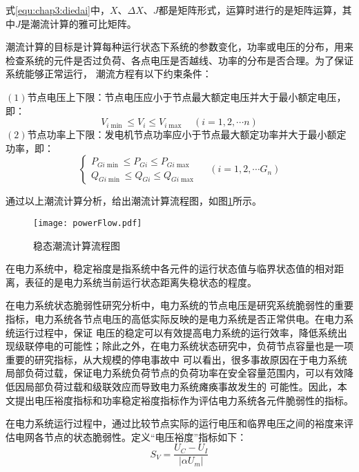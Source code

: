 式\ref{equ:chap3:diedai}中，$X$、$\Delta X$、$J$都是矩阵形式，运算时进行的是矩阵运算，其中$J$是潮流计算的雅可比矩阵。

潮流计算的目标是计算每种运行状态下系统的参数变化，功率或电压的分布，用来检查系统的元件是否过负荷、各点电压是否越线、功率的分布是否合理。为了保证系统能够正常运行，
潮流方程有以下约束条件：

$(1)$节点电压上下限：节点电压应小于节点最大额定电压并大于最小额定电压，即：
\begin{equation}
  V_{i \min } \leq V_{i} \leq V_{i \max } \quad(i=1,2, \cdots n)
  \end{equation}
$(2)$节点功率上下限：发电机节点功率应小于节点最大额定功率并大于最小额定功率，即：
\begin{equation}
\left\{\begin{array}{l}{P_{G i \min } \leq P_{G i} \leq P_{G i \max }} \\ {Q_{G i \min } \leq Q_{G i} \leq Q_{G i \max }}\end{array} \quad\left(i=1,2, \cdots G_{n}\right)\right.
\end{equation}

通过以上潮流计算分析，给出潮流计算流程图，如图\ref{fig:powerFlow}所示。
\begin{figure}[H] %
  \centering
  \texttt{[image: powerFlow.pdf]}
  \caption{稳态潮流计算流程图}
  \label{fig:powerFlow}
\end{figure}


在电力系统中，稳定裕度是指系统中各元件的运行状态值与临界状态值的相对距离，表征的是电力系统当前运行状态距离失稳状态的程度。

在电力系统状态脆弱性研究分析中，电力系统的节点电压是研究系统脆弱性的重要指标，电力系统各节点电压的高低实际反映的是电力系统是否正常供电。在电力系统运行过程中，保证
电压的稳定可以有效提高电力系统的运行效率，降低系统出现级联停电的可能性；除此之外，在电力系统状态研究中，负荷节点容量也是一项重要的研究指标，从大规模的停电事故中
可以看出，很多事故原因在于电力系统局部负荷过载，保证电力系统负荷节点的负荷功率在安全容量范围内，可以有效降低因局部负荷过载和级联效应而导致电力系统瘫痪事故发生的
可能性。因此，本文提出电压裕度指标和功率稳定裕度指标作为评估电力系统各元件脆弱性的指标。

在电力系统运行过程中，通过比较节点实际的运行电压和临界电压之间的裕度来评估电网各节点的状态脆弱性。定义“电压裕度”指标如下：
\begin{equation}
  S_V=\frac{U_{C}-U_{I}}{\left|\alpha U_{m}\right|}
  \end{equation}


